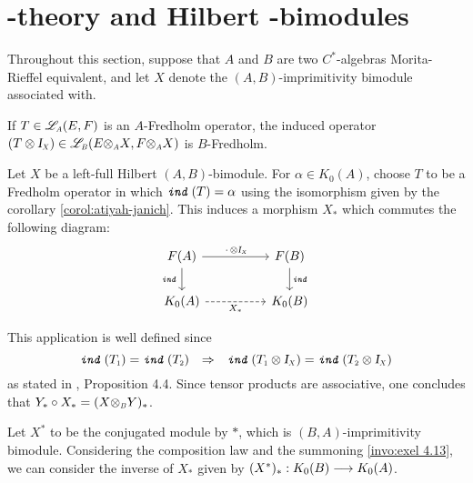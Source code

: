 \section[\texorpdfstring{\ensuremath{K}}{K}-theory and Hilbert \texorpdfstring{\ensuremath{C^*}}{C*}-bimodules]{\texorpdfstring{}{K}-theory and Hilbert \texorpdfstring{}{C*}-bimodules}

Throughout this section, suppose that $A$ and $B$ are two $C^*$-algebras Morita-Rieffel equivalent, and let $X$ denote the $(A,B)$-imprimitivity bimodule associated with.

\begin{invocacao}
	\label{invocacao:exel 4.3}
	If $T\in \sub\adj{A}(E,F)$ is an $A$-Fredholm operator, the induced operator $(T\otimes \sub\Id{X})\in \sub\adj{B}(E\sub\otimes{A} X, F\sub\otimes A X)$ is $B$-Fredholm.
\end{invocacao}

\begin{definicao}
	Let $X$ be a left-full Hilbert $(A,B)$-bimodule. For $\alpha\in K_0(A)$, choose $T$ to be a Fredholm operator in which $\texttt{\textit{ind}}\,(T)=\alpha$ using the isomorphism given by the corollary \ref{corol:atiyah-janich}. This induces a morphism $X_*$ which commutes the following diagram:
	\begin{equation*}
		\begin{tikzcd}
		F(A) \arrow[d, "\ind"'] \arrow[rr, "\,\cdot\, \otimes \sub\Id X"] &  & F(B) \arrow[d, "\ind"] \\
		K_0(A) \arrow[rr, "X_*"', dashed]                            &  & K_0(B)                
		\end{tikzcd}
	\end{equation*}
\end{definicao}

This application is well defined since 
\begin{equation*}
	\ind(\sub{T}{1})=\ind(\sub{T}{2}) \To \ind(\sub{T}{1}\otimes \sub\Id{X}) = \ind(\sub{T}{2}\otimes \sub\Id{X})
\end{equation*}
as stated in \cite{exel7fredholm}, Proposition 4.4. Since tensor products are associative, one concludes that $Y_* \circ X_* = (X \sub\otimes B Y)_*$. 

Let $X^*$ to be the conjugated module by $*$, which is $(B,A)$-imprimitivity bimodule. Considering the composition law and the summoning \ref{invo:exel 4.13}, we can consider the inverse of $X_*$ given by $(X^*)_*: K_0(B) \longrightarrow K_0(A)$. 

